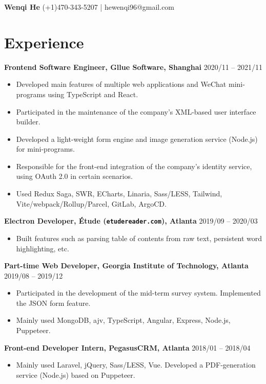 \documentclass[10pt]{article}
\begin{document}
{\bf\huge Wenqi He} \hfill (+1)470-343-5207 | hewenqi96@gmail.com

\section*{Experience}
\textbf{Frontend Software Engineer, Gllue Software, Shanghai} \hfill 2020/11 -- 2021/11
\begin{itemize}
\item Developed main features of multiple web applications and WeChat mini-programs using TypeScript and React.
\item Participated in the maintenance of the company's XML-based user interface builder. 
\item Developed a light-weight form engine and image generation service (Node.js) for mini-programs.
\item Responsible for the front-end integration of the company's identity service, using OAuth 2.0 in certain scenarios.
\item Used Redux Saga, SWR, ECharts, Linaria, Sass/LESS, Tailwind, Vite/webpack/Rollup/Parcel, GitLab, ArgoCD.
\end{itemize}

\vspace{0.5em}
\textbf{Electron Developer, Étude (\texttt{etudereader.com}), Atlanta} \hfill 2019/09 -- 2020/03
\begin{itemize}
\item Built features such as parsing table of contents from raw text, persistent word highlighting, etc.
\end{itemize}

\vspace{0.5em}
\textbf{Part-time Web Developer, Georgia Institute of Technology, Atlanta} \hfill 2019/08 -- 2019/12
\begin{itemize}
\item Participated in the development of the mid-term survey system. Implemented the JSON form feature.
\item Mainly used MongoDB, ajv, TypeScript, Angular, Express, Node.js, Puppeteer.
\end{itemize}

\vspace{0.5em}
\textbf{Front-end Developer Intern, PegasusCRM, Atlanta} \hfill 2018/01 -- 2018/04
\begin{itemize}
\item Mainly used Laravel, jQuery, Sass/LESS, Vue.  Developed a PDF-generation service (Node.js) based on Puppeteer.
\end{itemize}
\end{document}
